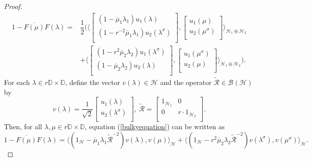 \documentclass[12pt,reqno]{amsart}
\numberwithin{equation}{section}
\theoremstyle{definition}
\begin{document}
\begin{proof}
\begin{align}
1-\overline{F(\mu)}F(\lambda) =& \dfrac{1}{2}\Bigg(\Bigg\langle
\begin{bmatrix}
	(1-\overline\mu_{1}\lambda_{1})u_{1}(\lambda) \\
	(1-r^{-2}\overline\mu_{1}\lambda_{1})u_{2}(\lambda^{\sigma}) \nonumber \\
\end{bmatrix},
\begin{bmatrix}
           u_{1}(\mu) \\
           u_{2}(\mu^{\sigma}) \\
\end{bmatrix}\Bigg\rangle_{\mathcal{H}_{1}\oplus \mathcal{H}_{2}}\\
& + \Bigg\langle
\begin{bmatrix}
	(1-r^{2}\overline\mu_{2}\lambda_{2})u_{1}({\lambda^{\sigma}}) \\
	(1-\overline\mu_{2}\lambda_{2})u_{2}({\lambda}) \\
\end{bmatrix},
\begin{bmatrix}
	u_{1}({\mu}^{\sigma}) \\
	u_{2}({\mu}) \\
\end{bmatrix}\Bigg\rangle_{\mathcal{H}_{1}\oplus \mathcal{H}_{2}}\Bigg). \label{bulkyequation}
\end{align}
For each $\lambda \in r\mathbb{D}\times\mathbb{D}$, define
the vector $v(\lambda)\in\mathcal{H}$ and the operator $\widetilde{\mathcal{R}} \in \mathcal{B(H)}$ by
\begin{equation}\nonumber
v({\lambda}) = \dfrac{1}{\sqrt{2}}
\begin{bmatrix}
	u_{1}({\lambda}) \\
	u_{2}({\lambda^{\sigma}}) \\
\end{bmatrix},~
\widetilde{\mathcal{R}} = 
\begin{bmatrix}
	1_{\mathcal{H}_1}   	& 0                \\
	0 		& r\cdot 1_{\mathcal{H}_2}  	\\
\end{bmatrix}.
\end{equation}
Then, for all $\lambda,\mu \in r\mathbb{D}\times\mathbb{D}$, equation (\ref{bulkyequation}) can be written as
\begin{equation}\label{averagedequations}
1-\overline{F(\mu)}F(\lambda) = \Big\langle(1_{\mathcal{H}}-\overline{\mu}_{1}\lambda_{1}\widetilde{\mathcal{R}}^{-2})v({\lambda}),v({\mu})\Big\rangle_{\mathcal{H}}+\Big\langle(1_{\mathcal{H}}-r^{2}\overline{\mu}_{2}\lambda_{2}\widetilde{\mathcal{R}}^{-2})v({\lambda}^{\sigma}),v(\mu^{\sigma})\Big\rangle_{\mathcal{H}}.

\end{equation}
\end{proof}
\end{document}
